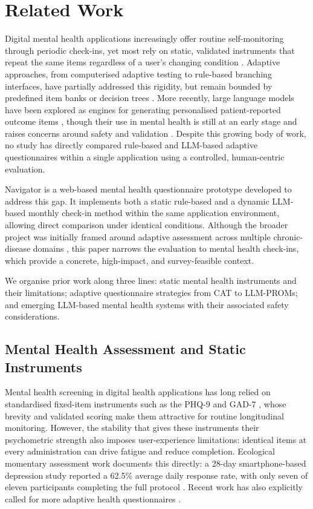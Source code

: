 \documentclass[conference]{IEEEtran}
\begin{document}
\section{Related Work}
\label{sec:related}

Digital mental health applications increasingly offer routine self-monitoring
through periodic check-ins, yet most rely on static, validated instruments
that repeat the same items regardless of a user's changing condition
\cite{kroenke2001, spitzer2006}. Adaptive approaches, from computerised
adaptive testing to rule-based branching interfaces, have partially addressed
this rigidity, but remain bounded by predefined item banks or decision trees
\cite{gibbons2008, wang2023}. More recently, large language models have been
explored as engines for generating personalised patient-reported outcome items
\cite{terheyden2025}, though their use in mental health is still at an early
stage and raises concerns around safety and validation
\cite{hua2025, shen2026}. Despite this growing body of work, no study has
directly compared rule-based and LLM-based adaptive questionnaires within a
single application using a controlled, human-centric evaluation.

Navigator is a web-based mental health questionnaire prototype developed to
address this gap. It implements both a static rule-based and a dynamic
LLM-based monthly check-in method within the same application environment,
allowing direct comparison under identical conditions. Although the broader
project was initially framed around adaptive assessment across multiple
chronic-disease domains \cite{aihw2012}, this paper narrows the evaluation
to mental health check-ins, which provide a concrete, high-impact, and
survey-feasible context.

We organise prior work along three lines: static mental health
instruments and their limitations; adaptive questionnaire strategies
from CAT to LLM-PROMs; and emerging LLM-based mental health systems with
their associated safety considerations.

\subsection{Mental Health Assessment and Static Instruments}
\label{subsec:rw_static}

Mental health screening in digital health applications has long relied on
standardised fixed-item instruments such as the PHQ-9 \cite{kroenke2001}
and GAD-7 \cite{spitzer2006}, whose brevity and validated scoring make
them attractive for routine longitudinal monitoring. However, the
stability that gives these instruments their psychometric strength also
imposes user-experience limitations: identical items at every
administration can drive fatigue and reduce completion. Ecological
momentary assessment work documents this directly: a 28-day
smartphone-based depression study reported a 62.5\% average daily
response rate, with only seven of eleven participants completing the full
protocol \cite{maatoug2021}. Recent work has also explicitly called for
more adaptive health questionnaires \cite{malanin2025}.
\end{document}
